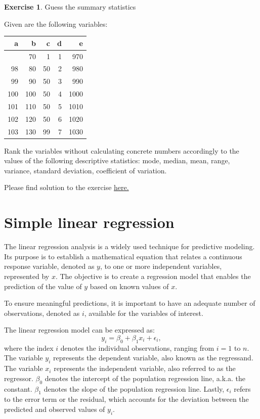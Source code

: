 \documentclass[
  12pt,
  oneside]{book}
\theoremstyle{definition}
\theoremstyle{definition}
\theoremstyle{definition}
\newtheorem{exercise}{Exercise}[chapter]
\theoremstyle{definition}
\theoremstyle{remark}
\begin{document}
\begin{exercise}
\protect\hypertarget{exr:guessstat}{}\label{exr:guessstat}Guess the summary statistics

Given are the following variables:

\begin{longtable}[]{@{}rrrrr@{}}
\toprule\noalign{}
a & b & c & d & e \\
\midrule\noalign{}
\endhead
\bottomrule\noalign{}
\endlastfoot
97 & 70 & 1 & 1 & 970 \\
98 & 80 & 50 & 2 & 980 \\
99 & 90 & 50 & 3 & 990 \\
100 & 100 & 50 & 4 & 1000 \\
101 & 110 & 50 & 5 & 1010 \\
102 & 120 & 50 & 6 & 1020 \\
103 & 130 & 99 & 7 & 1030 \\
\end{longtable}

Rank the variables without calculating concrete numbers accordingly to the values of the following descriptive statistics: mode, median, mean, range, variance, standard deviation, coefficient of variation.

Please find solution to the exercise \protect\hyperlink{sol:guessstat}{here.}
\end{exercise}

\hypertarget{simple-linear-regression}{%
\section{Simple linear regression}\label{simple-linear-regression}}

The linear regression analysis is a widely used technique for predictive modeling. Its purpose is to establish a mathematical equation that relates a continuous response variable, denoted as \(y\), to one or more independent variables, represented by \(x\). The objective is to create a regression model that enables the prediction of the value of \(y\) based on known values of \(x\).

To ensure meaningful predictions, it is important to have an adequate number of observations, denoted as \(i\), available for the variables of interest.

The linear regression model can be expressed as:
\[
y_i = \beta_{0} + \beta_{1} x_i + \epsilon_i,
\]
where the index \(i\) denotes the individual observations, ranging from \(i = 1\) to \(n\). The variable \(y_i\) represents the dependent variable, also known as the regressand. The variable \(x_i\) represents the independent variable, also referred to as the regressor. \(\beta_0\) denotes the intercept of the population regression line, a.k.a. the constant. \(\beta_1\) denotes the slope of the population regression line. Lastly, \(\epsilon_i\) refers to the error term or the residual, which accounts for the deviation between the predicted and observed values of \(y_i\).
\end{document}
